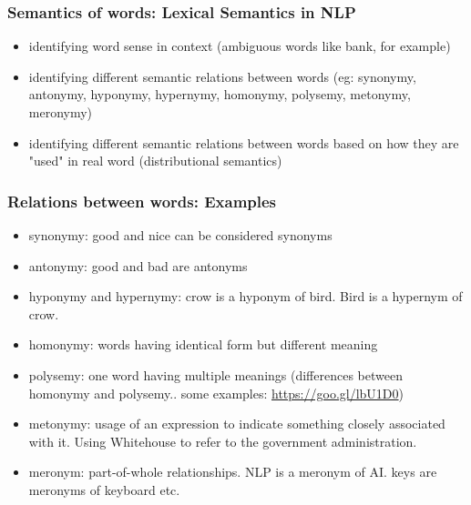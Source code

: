 \documentclass{beamer}
\begin{document}
\begin{frame}
\frametitle{Semantics of words: Lexical Semantics in NLP}
\begin{itemize}
\item identifying word sense in context (ambiguous words like bank, for example)
\item identifying different semantic relations between words (eg: synonymy, antonymy, hyponymy, hypernymy, homonymy, polysemy, metonymy, meronymy)
\item identifying different semantic relations between words based on how they are "used" in real word (distributional semantics)
\end{itemize}
\end{frame}

\begin{frame}
\frametitle{Relations between words: Examples}
\begin{itemize}
\item synonymy: good and nice can be considered synonyms
\item antonymy: good and bad are antonyms
\item hyponymy and hypernymy: crow is a hyponym of bird. Bird is a hypernym of crow.
\item homonymy: words having identical form but different meaning
\item polysemy: one word having multiple meanings (differences between homonymy and polysemy.. some examples: \url{https://goo.gl/lbU1D0}) 
\item metonymy: usage of an expression to indicate something closely associated with it. Using Whitehouse to refer to the government administration.
\item meronym: part-of-whole relationships. NLP is a meronym of AI. keys are meronyms of keyboard etc.
\end{itemize}
\end{frame}
\end{document}
